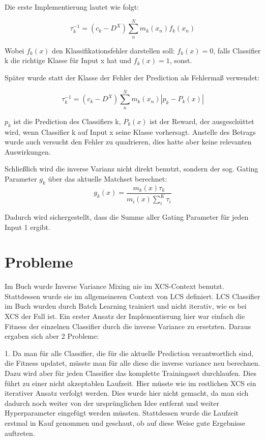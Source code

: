 \documentclass[10pt]{ocsmnar}
\begin{document}
Die erste Implementierung lautet wie folgt: 

$$ \tau_{k}^{-1} = (c_{k} - D^{X}) \sum_{n}^{N} m_{k}(x_{n})f_{k}(x_{n}) $$

Wobei $f_{k}(x)$ den Klassifikationsfehler darstellen soll: $f_{k}(x) = 0$, falls Classifier k die richtige Klasse für Input x hat und $f_{k}(x) = 1$, sonst. 

Später wurde statt der Klasse der Fehler der Prediction als Fehlermaß verwendet:

$$ \tau_{k}^{-1} = (c_{k} - D^{X}) \sum_{n}^{N} m_{k}(x_{n}) |p_{k} - P_{k}(x)|  $$

$p_{k}$ ist die Prediction des Classifiers k, $P_{k}(x)$ ist der Reward, der ausgeschüttet wird, wenn Classifier k auf Input x seine Klasse vorhersagt. 
Anstelle des Betrags wurde auch versucht den Fehler zu quadrieren, dies hatte aber keine relevanten Auswirkungen.

Schließlich wird die inverse Varianz nicht direkt benutzt, sondern  der sog. Gating Parameter $g_{k}$ über das aktuelle Matchset berechnet: 
$$ g_k(x) = \frac{m_k(x)\tau_k}{m_i(x)\sum_i^K \tau_i}$$

Dadurch wird sichergestellt, dass die Summe aller Gating Parameter für jeden Input 1 ergibt. 




\section{Probleme}
Im Buch wurde Inverse Variance Mixing nie im XCS-Context benutzt. Stattdessen wurde sie im allgemeineren Context von LCS definiert. LCS Classifier im Buch wurden durch Batch Learning trainiert und nicht iterativ, wie es bei XCS der Fall ist. 
Ein erster Ansatz der Implementierung hier war einfach die Fitness der einzelnen Classifier durch die inverse Variance zu ersetzten. 
Daraus ergaben sich aber 2 Probleme: 

1. Da man für alle Classifier, die für die aktuelle Prediction verantwortlich sind, die Fitness updatet, müsste man für alle diese die inverse variance neu berechnen. Dazu wird aber für jeden Classifier das komplette Trainingsset durchlaufen. Dies führt zu einer nicht akzeptablen Laufzeit. Hier müsste wie im restlichen XCS ein iterativer Ansatz verfolgt werden. Dies wurde hier nicht gemacht, da man sich dadurch noch weiter von der ursprünglichen Idee entfernt und weiter Hyperparameter eingefügt werden müssten. 
Stattdessen wurde die Laufzeit erstmal in Kauf genommen und geschaut, ob auf diese Weise gute Ergebnisse auftreten.  
\end{document}

